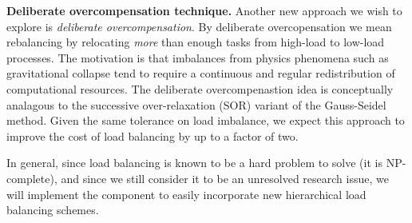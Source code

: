 \documentclass[10pt,twocolumn]{article}
\begin{document}
\textbf{Deliberate overcompensation technique.}
%
Another new approach we wish to explore is \textit{deliberate
  overcompensation}.  By deliberate overcopensation we mean
rebalancing by relocating \textit{more} than enough tasks from
high-load to low-load processes.  The motivation is that imbalances
from physics phenomena such as gravitational collapse tend to require
a continuous and regular redistribution of computational resources.
The deliberate overcompenastion idea is conceptually analagous to the
successive over-relaxation (SOR) variant of the Gauss-Seidel method.
Given the same tolerance on load imbalance, we expect this approach to
improve the cost of load balancing by up to a factor of two.

In general, since load balancing is known to be a hard problem to
solve (it is NP-complete), and since we still consider it to be an
unresolved research issue, we will implement the 
component to easily incorporate new hierarchical load balancing
schemes.
\end{document}
